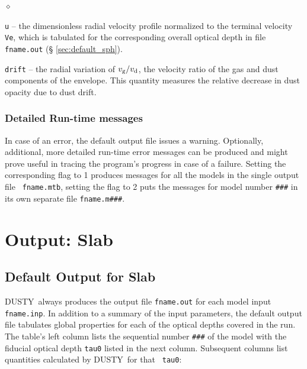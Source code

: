 \documentclass[11pt]{article}
\def\D    {{\sf DUSTY}}
\begin{document}
\begin{list}{$\diamond$}{}
\item {\tt u} -- the dimensionless radial velocity profile normalized
  to the terminal velocity {\tt Ve}, which is tabulated for the
  corresponding overall optical depth in file {\tt fname.out} (\S
  \ref{sec:default_sph}).
\item {\tt drift} -- the radial variation of $v_{\rm g}/v_{\rm d}$,
  the velocity ratio of the gas and dust components of the envelope.
  This quantity measures the relative decrease in dust opacity due to
  dust drift.

\end{list}

\subsubsection{Detailed Run-time messages}
\label{sec:error_sph}

In case of an error, the default output file issues a
warning. Optionally, additional, more detailed run-time error messages
can be produced and might prove useful in tracing the program's
progress in case of a failure. Setting the corresponding flag to 1
produces messages for all the models in the single output file {\tt
  fname.mtb}, setting the flag to 2 puts the messages for model number
{\tt \#\#\#} in its own separate file {\tt fname.m\#\#\#}.


\section{Output: Slab}
\label{sec:output_slb}

\subsection{Default Output for Slab}
\label{sec:default_slb}

\D\ always produces the output file {\tt fname.out} for each model
input {\tt fname.inp}. In addition to a summary of the input
parameters, the default output file tabulates global properties for
each of the optical depths covered in the run. The table's left column
lists the sequential number {\tt \#\#\#} of the model with the
fiducial optical depth {\tt tau0} listed in the next column.
Subsequent columns list quantities calculated by \D\ for that {\tt
  tau0}:
\end{document}
